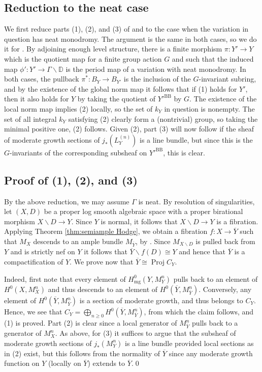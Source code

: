 \documentclass{amsart}
\newcommand{\bs}{\backslash}
\newcommand{\proj}{\operatorname{Proj}}
\newcommand{\ol}{\overline}
\theoremstyle{definition}
\theoremstyle{remark}
\def\bD{\mathbb{D}}
\def\BB{\mathrm{BB}}
\def\bdd{\mathrm{mg}}
\renewcommand{\bar}[1]{\ol{#1}}
\numberwithin{equation}{section}
\begin{document}
\subsection{Reduction to the neat case}
We first reduce parts (1), (2), and (3) of  and  to the case when the variation in question has neat monodromy.  The argument is the same in both cases, so we do it for .  By adjoining enough level structure, there is a finite morphism $\pi:Y'\to Y$ which is the quotient map for a finite group action $G$ and such that the induced map $\phi':Y'\to \Gamma\backslash \bD$ is the period map of a variation with neat monodromy.  In both cases, the pullback $\pi^*: B_Y\to B_{Y'}$ is the inclusion of the $G$-invariant subring, and by the existence of the global norm map it follows that if (1) holds for $Y'$, then it also holds for $Y$ by taking the quotient of $Y'^{\BB}$ by $G$.  The existence of the local norm map implies (2) locally, so the set of $k_Y$ in question is nonempty.  The set of all integral $k_Y$ satisfying (2) clearly form a (nontrivial) group, so taking the minimal positive one, (2) follows.  Given (2), part (3) will now follow if the sheaf of moderate growth sections of 
$j_*(L_Y^{(n)})$ is a line bundle, but since this is the $G$-invariants of the corresponding subsheaf on $Y'^{\BB}$, this is clear.


\subsection{Proof of  (1), (2), and (3)}
By the above reduction, we may assume $\Gamma$ is neat.  By resolution of singularities, let $(X,D)$ be a proper log smooth algebraic space with a proper birational morphism $X\bs D\to Y$. Since $Y$ is normal, it follows that $X\bs D\to Y$ is a fibration. Applying Theorem \ref{thm:semiample Hodge}, we obtain a fibration $f:X\to \bar Y$ such that $M_X$ descends to an ample bundle $M_{\bar Y}$, by . Since $M_{X\bs D}$ is pulled back from $Y$ and is strictly nef on $Y$ it follows that $\bar Y\bs f(D)\cong Y$ and hence that $\bar Y$ is a compactification of $Y$. We prove now that $\bar Y\cong \proj C_Y$.

Indeed, first note that every element of $H^0_{\bdd}(Y,M_Y^{n})$ pulls back to an element of $H^0(X,M^{n}_X)$ and thus descends to an element of $H^0(\bar Y,M^{n}_{\bar Y})$. Conversely, any element of $H^0(\bar Y,M^{n}_{\bar Y})$ is a section of moderate growth, and thus belongs to $C_Y$. Hence, we see that $C_Y= \bigoplus_{n\geq 0}H^0(\bar Y,M_{\bar Y}^{n})$, from which the claim follows, and (1) is proved.  Part (2) is clear since a local generator of $M_{\bar Y}^n$ pulls back to a generator of $M_X^n$.  As above, for (3) it suffices to argue that the subsheaf of moderate growth sections of $j_*(M_Y^n)$ is a line bundle provided local sections as in (2) exist, but this follows from the normality of $\bar Y$ since any moderate growth function on $Y$ (locally on $\bar Y$) extends to $\bar Y$.\qed
\end{document}
